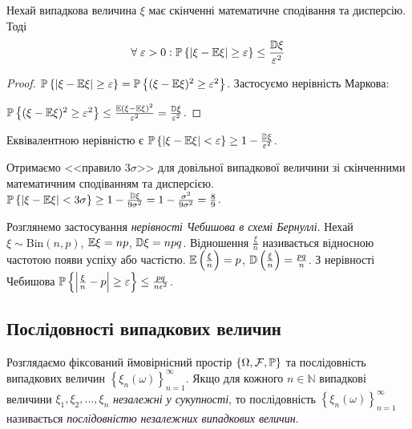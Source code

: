 \begin{theorem*}
    Нехай випадкова величина $\xi$ має скінченні математичне сподівання та дисперсію.
Тоді
\begin{gather}\label{Cheb_ineq}
    \forall \; \varepsilon >0 : \P\left\{ \left|\xi - \E\xi\right| \geq \varepsilon\right\} \leq \frac{\D\xi}{\varepsilon^2}
\end{gather}
\end{theorem*} 
\begin{proof}
    $\P\left\{ |\xi - \E\xi| \geq \varepsilon\right\} = \P\left\{ (\xi - \E\xi)^2 \geq \varepsilon^2\right\}$.
    Застосуємо нерівність Маркова:
    
    \noindent $\P\left\{ (\xi - \E\xi)^2 \geq \varepsilon^2\right\} \leq \frac{\E(\xi - \E\xi)^2}{\varepsilon^2} = \frac{\D\xi}{\varepsilon^2}$.
\end{proof}
\begin{remark}
    Еквівалентною нерівністю є $\P\left\{ \left|\xi - \E\xi\right| < \varepsilon\right\} \geq 1 - \frac{\D\xi}{\varepsilon^2}$.
\end{remark}
\begin{example}
    Отримаємо <<правило $3 \sigma$>> для довільної випадкової величини зі скінченними математичним сподіванням та дисперсією.
    $\P\left\{ |\xi - \E\xi| < 3 \sigma\right\} \geq 1 - \frac{\D\xi}{9 \sigma^2} = 1 - \frac{\sigma^2}{9 \sigma^2} = \frac{8}{9}$.
\end{example}
Розглянемо застосування \emph{нерівності Чебишова в схемі Бернуллі}. Нехай $\xi \sim \mathrm{Bin}(n, p)$, $\E\xi = np$, $\D\xi = npq$.
Відношення $\frac{\xi}{n}$ називається відносною частотою появи успіху або частістю. $\E\left( \frac{\xi}{n}\right) = p$, 
$\D\left( \frac{\xi}{n}\right) = \frac{pq}{n}$. З нерівності Чебишова 
$\P\left\{ \left|\frac{\xi}{n} - p\right| \geq \varepsilon\right\} \leq \frac{pq}{n \epsilon^2}$.

\subsection{Послідовності випадкових величин}
Розглядаємо фіксований ймовірнісний простір $\left\{ \Omega, \mathcal{F}, \P\right\}$ та
послідовність випадкових величин $\left\{ \xi_n (\omega)\right\}_{n=1}^{\infty}$.
Якщо для кожного $n \in \mathbb{N}$ випадкові величини $\xi_1, \xi_2, ..., \xi_n$ \emph{незалежні у сукупності},
то послідовність $\left\{ \xi_n (\omega)\right\}_{n=1}^{\infty}$ називається \emph{послідовністю незалежних випадкових величин}.

